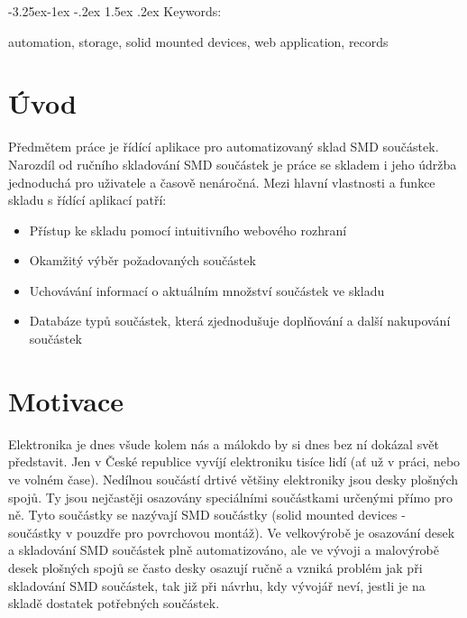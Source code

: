 \documentclass[12pt, a4paper, oneside]{article}
\makeatletter
\renewcommand\paragraph{\@startsection{paragraph}{4}{\z@}%
      {-3.25ex\@plus -1ex \@minus -.2ex}%
      {1.5ex \@plus .2ex}%
      {\normalfont\normalsize\bfseries}}
\makeatother
\begin{document}
\paragraph{Keywords:}

automation, storage, solid mounted devices, web application, records

\newpage

\setcounter{page}{1}  %


\tableofcontents{}

\newpage

\pagestyle{plain}

\section*{Úvod}  %

Předmětem práce je řídící aplikace pro automatizovaný sklad SMD součástek. Narozdíl od ručního skladování SMD součástek je práce se skladem i jeho údržba jednoduchá pro uživatele a časově nenáročná. Mezi hlavní vlastnosti a funkce skladu s řídící aplikací patří:
\begin{itemize}
\item Přístup ke skladu pomocí intuitivního webového rozhraní
\item Okamžitý výběr požadovaných součástek
\item Uchovávání informací o aktuálním množství součástek ve skladu
\item Databáze typů součástek, která zjednodušuje doplňování a další nakupování součástek
\end{itemize}

\newpage

\section{Motivace}

Elektronika je dnes všude kolem nás a málokdo by si dnes bez ní dokázal svět představit. Jen v České republice vyvíjí elektroniku tisíce lidí (ať už v práci, nebo ve volném čase). Nedílnou součástí drtivé většiny elektroniky jsou desky plošných spojů. Ty jsou nejčastěji osazovány speciálními součástkami určenými přímo pro ně. Tyto součástky se nazývají SMD součástky (solid mounted devices - součástky v pouzdře pro povrchovou montáž). Ve velkovýrobě je osazování desek a skladování SMD součástek plně automatizováno, ale ve vývoji a malovýrobě desek plošných spojů se často desky osazují ručně a vzniká problém jak při skladování SMD součástek, tak již při návrhu, kdy vývojář neví, jestli je na skladě dostatek potřebných součástek.
\end{document}
